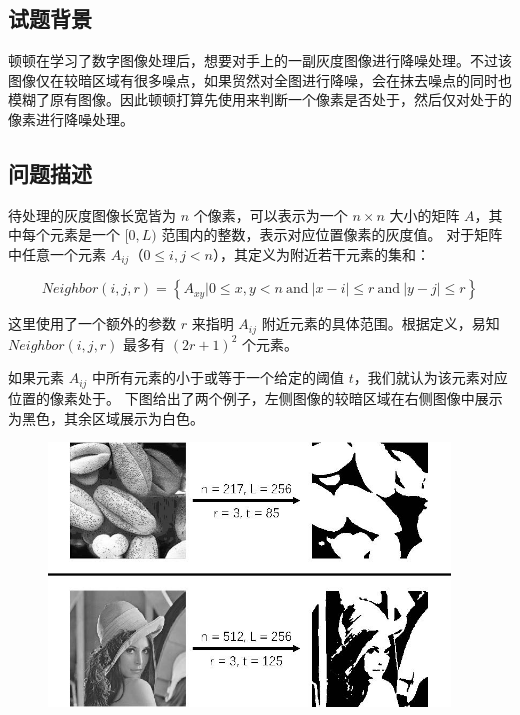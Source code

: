 \subsection*{试题背景}

顿顿在学习了数字图像处理后，想要对手上的一副灰度图像进行降噪处理。不过该图像仅在较暗区域有很多噪点，如果贸然对全图进行降噪，会在抹去噪点的同时也模糊了原有图像。因此顿顿打算先使用{}来判断一个像素是否处于{}，然后仅对处于{}的像素进行降噪处理。


\subsection*{问题描述}

待处理的灰度图像长宽皆为 $n$ 个像素，可以表示为一个 $n \times n$ 大小的矩阵 $A$，其中每个元素是一个 $[0, L)$ 范围内的整数，表示对应位置像素的灰度值。
对于矩阵中任意一个元素 $A_{ij}$（$0 \le i, j < n$），其{}定义为附近若干元素的集和：

\begin{equation*}
 Neighbor(i, j, r) = \left\{ A_{xy} | 0 \le x, y < n \mathrm{~and~} |x-i| \le r \mathrm{~and~} |y-j| \le r \right\} 
\end{equation*}


这里使用了一个额外的参数 $r$ 来指明 $A_{ij}$ 附近元素的具体范围。根据定义，易知 $Neighbor(i, j, r)$ 最多有 $(2r+1)^2$ 个元素。

如果元素 $A_{ij}$ {}中所有元素的{}小于或等于一个给定的阈值 $t$，我们就认为该元素对应位置的像素处于{}。
下图给出了两个例子，左侧图像的较暗区域在右侧图像中展示为黑色，其余区域展示为白色。

\begin{figure}[H]
    \centering
    \includegraphics[width=0.95\textwidth]{image/22/2-p-1.jpg}
\end{figure}


